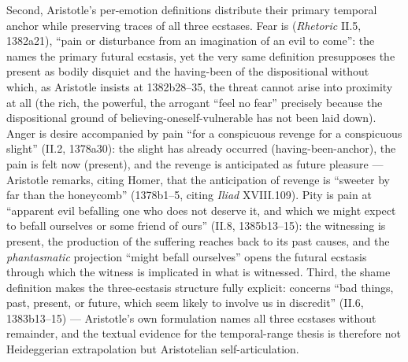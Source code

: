 Second, Aristotle's per-emotion definitions distribute their primary temporal anchor while preserving traces of all three ecstases. Fear is  (\textit{Rhetoric} II.5, 1382a21), ``pain or disturbance from an imagination of an evil to come'': the  names the primary futural ecstasis, yet the very same definition presupposes the present  as bodily disquiet and the having-been of the dispositional  without which, as Aristotle insists at 1382b28--35, the threat cannot arise into proximity at all (the rich, the powerful, the arrogant ``feel no fear'' precisely because the dispositional ground of believing-oneself-vulnerable has not been laid down). Anger is desire accompanied by pain ``for a conspicuous revenge for a conspicuous slight'' (II.2, 1378a30): the slight has already occurred (having-been-anchor), the pain is felt now (present), and the revenge is anticipated as future pleasure --- Aristotle remarks, citing Homer, that the anticipation of revenge is ``sweeter by far than the honeycomb'' (1378b1--5, citing \textit{Iliad} XVIII.109). Pity is pain at ``apparent evil befalling one who does not deserve it, and which we might expect to befall ourselves or some friend of ours'' (II.8, 1385b13--15): the witnessing is present, the production of the suffering reaches back to its past causes, and the \textit{phantasmatic} projection ``might befall ourselves'' opens the futural ecstasis through which the witness is implicated in what is witnessed. Third, the shame definition makes the three-ecstasis structure fully explicit:  concerns ``bad things, past, present, or future, which seem likely to involve us in discredit'' (II.6, 1383b13--15) --- Aristotle's own formulation names all three ecstases without remainder, and the textual evidence for the temporal-range thesis is therefore not Heideggerian extrapolation but Aristotelian self-articulation.

